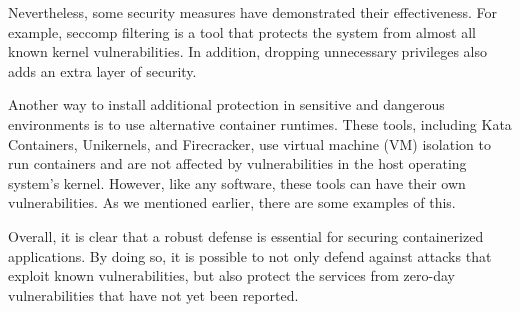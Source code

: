 Nevertheless, some security measures have demonstrated their effectiveness. For example, seccomp filtering is a tool that protects the system from almost all known kernel vulnerabilities. In addition, dropping unnecessary privileges also adds an extra layer of security.

Another way to install additional protection in sensitive and dangerous environments is to use alternative container runtimes. These tools, including Kata Containers, Unikernels, and Firecracker, use virtual machine (VM) isolation to run containers and are not affected by vulnerabilities in the host operating system's kernel. However, like any software, these tools can have their own vulnerabilities. As we mentioned earlier, there are some examples of this.

Overall, it is clear that a robust defense is essential for securing containerized applications. By doing so, it is possible to not only defend against attacks that exploit known vulnerabilities, but also protect the services from zero-day vulnerabilities that have not yet been reported.
